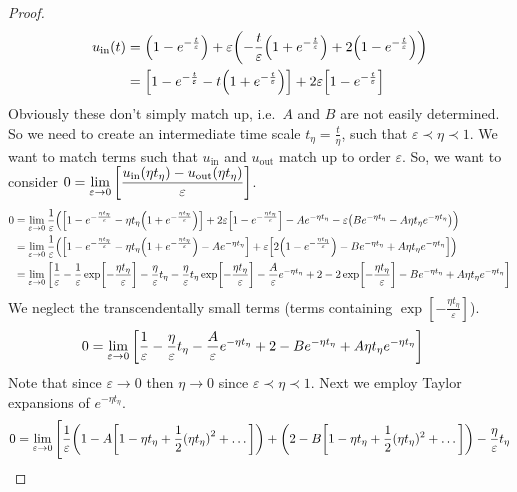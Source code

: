 \documentclass{article} %
\theoremstyle{plain}
\newcommand{\E}{\varepsilon}
\numberwithin{equation}{section} %
\numberwithin{figure}{section} %
\numberwithin{table}{section} %
\begin{document}
\begin{proof}
\begin{align*}
        u_{\text{in}}(t) &= \qty(1 - e^{-\frac{t}{\E}}) + \E\qty(-\frac{t}{\E}\qty(1 + e^{-\frac{t}{\E}}) + 2\qty(1 - e^{-\frac{t}{\E}})) \\
        &= \qty[1 - e^{-\frac{t}{\E}} - t\qty(1 + e^{-\frac{t}{\E}})] + 2\E\qty[1 - e^{-\frac{t}{\E}}]
    \end{align*}
    Obviously these don't simply match up, i.e.~$A$ and $B$ are not easily determined.  So we need to create an intermediate time scale $t_\eta = \frac{t}{\eta}$, such that $\E \prec \eta \prec 1$.  We want to match terms such that $u_\text{in}$ and $u_\text{out}$ match up to order $\E$.  So, we want to consider $0 = \displaystyle\lim_{\E \rightarrow 0}\qty[\frac{u_\text{in}(\eta t_\eta) - u_\text{out}(\eta t_\eta)}{\E}]$.
    \begin{align*}
        0 &= \lim_{\E \rightarrow 0}\frac{1}{\E}\qty(\qty[1 - e^{-\frac{\eta t_\eta}{\E}} - \eta t_\eta\qty(1 + e^{-\frac{\eta t_\eta}{\E}})] + 2\E\qty[1 - e^{-\frac{\eta t_\eta}{\E}}] - Ae^{-\eta t_\eta} - \E\qty(Be^{-\eta t_\eta} - A\eta t_\eta e^{-\eta t_\eta})) \\
        &= \lim_{\E \rightarrow 0}\frac{1}{\E}\qty(\qty[1 - e^{-\frac{\eta t_\eta}{\E}} - \eta t_\eta\qty(1 + e^{-\frac{\eta t_\eta}{\E}}) - A e^{-\eta t_\eta}] + \E\qty[2\qty(1 - e^{-\frac{\eta t_\eta}{\E}}) - B e^{-\eta t_\eta} + A\eta t_\eta e^{-\eta t_\eta}]) \\
        &= \lim_{\E \rightarrow 0} \qty[\frac{1}{\E} - \frac{1}{\E}\exp[-\frac{\eta t_\eta}{\E}] - \frac{\eta}{\E}t_\eta - \frac{\eta}{\E}t_\eta \exp[-\frac{\eta t_\eta}{\E}] - \frac{A}{\E}e^{-\eta t_\eta} + 2 - 2\exp[-\frac{\eta t_\eta}{\E}] - B e^{-\eta t_\eta} + A\eta t_\eta e^{-\eta t_\eta}]
    \end{align*}
    We neglect the transcendentally small terms (terms containing $\exp[-\frac{\eta t_\eta}{\E}]$).
    \begin{align*}
        0 &= \lim_{\E \rightarrow 0} \qty[\frac{1}{\E} - \frac{\eta}{\E}t_\eta - \frac{A}{\E}e^{-\eta t_\eta} + 2 - B e^{-\eta t_\eta} + A\eta t_\eta e^{-\eta t_\eta}]
    \end{align*}
    Note that since $\E \rightarrow 0$ then $\eta \rightarrow 0$ since $\E \prec \eta \prec 1$.  Next we employ Taylor expansions of $e^{-\eta t_\eta}$.
    \begin{align*}
        0 &= \lim_{\E \rightarrow 0} \Bigg[\frac{1}{\E}\qty(1 - A\qty[1 - \eta t_\eta + \frac{1}{2}\qty(\eta t_\eta)^2 + \dots]) + \qty(2 - B\qty[1 - \eta t_\eta + \frac{1}{2}(\eta t_\eta)^2 + \dots]) - \frac{\eta}{\E}t_\eta \\

\end{align*}
\end{proof}
\end{document}
